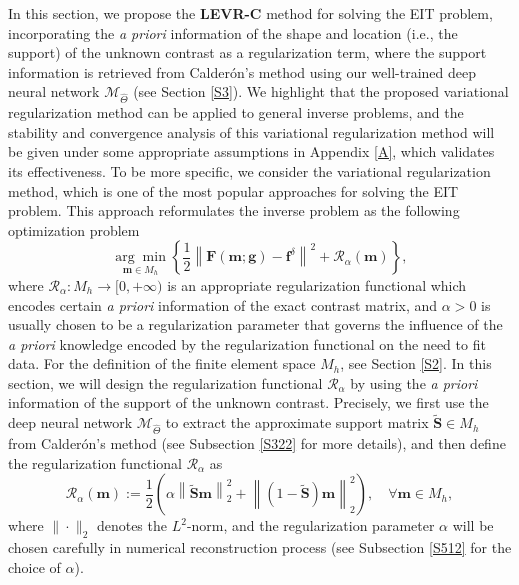 \documentclass[11pt]{article}
\newcommand{\Calderon}{Calder\'{o}n}
\newcommand{\bds}[1]{\boldsymbol{#1}}
\begin{document}
In this section, we propose the \textbf{LEVR-C} method for solving the EIT problem, incorporating the \textit{a priori} information of the shape and location (i.e., the support) of the unknown contrast as a regularization term, where the support information is retrieved from \Calderon's method using our well-trained deep neural network $ \mathcal{M}_{\widehat{\Theta}} $ (see Section \ref{S3}).
We highlight that the proposed variational regularization method can be applied to general inverse problems, and the stability and convergence analysis of this variational regularization method will be given under some appropriate assumptions in Appendix \ref{A}, which validates its effectiveness.
To be more specific, we consider the variational regularization method, which is one of the most popular approaches for solving the EIT problem.
This approach reformulates the inverse problem as the following optimization problem
\begin{equation}\label{51}
\underset{\bds{m}\in M_h}{\arg\min}\left\{\dfrac{1}{2}\left\|\bds{F}(\bds{m}; \bds{g}) - \bds{f}^\delta\right\|^2 + \mathcal{R}_\alpha(\bds{m})\right\},
\end{equation}
where $\mathcal{R}_\alpha: M_h \to [0, +\infty)$ is an appropriate regularization functional which encodes certain \textit{a priori} information of the exact contrast matrix, and $ \alpha>0 $ is usually chosen to be a regularization parameter that governs the influence of the \textit{a priori} knowledge encoded by the regularization functional on the need to fit data.
For the definition of the finite element space $ M_h $, see Section \ref{S2}. 
In this section, we will design the regularization functional $\mathcal{R}_\alpha$ by using the \textit{a priori} information of the support of the unknown contrast.
Precisely, we first use the deep neural network $ \mathcal{M}_{\widehat{\Theta}} $ to extract the approximate support matrix $ \widetilde{\bds{S}}\in M_h $ from \Calderon's method (see Subsection \ref{S322} for more details), and then define the regularization functional $\mathcal{R}_\alpha$ as
\begin{equation}\label{52}
\mathcal{R}_\alpha(\bds{m}) := \dfrac{1}{2}\left(\alpha\left\|\widetilde{\bds{S}}\bds{m}\right\|^2_2 + \left\|\left(1-\widetilde{\bds{S}}\right)\bds{m}\right\|^2_2\right),\quad \forall \bds{m}\in M_h,
\end{equation}
where $ \|\cdot\|_2 $ denotes the $ L^2 $-norm, and the regularization parameter $\alpha$ will be chosen carefully in numerical reconstruction process (see Subsection \ref{S512} for the choice of $\alpha$).
\end{document}
